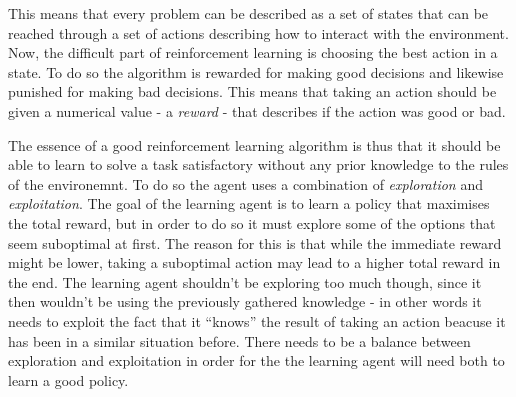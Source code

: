 \documentclass[11pt]{article}
\begin{document}
This means that every problem can be described as a set of states that can be reached
through a set of actions describing how to interact with the environment.
Now, the difficult part of reinforcement learning is choosing the best action in a
state.
To do so the algorithm is rewarded for making good decisions and likewise punished for making
bad decisions.
This means that taking an action should be given a numerical value
- a \textit{reward} - that describes if the action was good or bad.

The essence of a good reinforcement learning algorithm is thus that it should be able to learn
to solve a task satisfactory without any prior knowledge to the rules of the environemnt.
To do so the agent uses a combination of \textit{exploration} and \textit{exploitation}.
The goal of the learning agent is to learn a policy that maximises the total reward, but in order to do
so it must explore some of the options that seem suboptimal at first.
The reason for this is that while the immediate reward might be lower, taking a
suboptimal action may lead to a higher total reward in the end.
The learning agent shouldn't be exploring too much though, since it then wouldn't
be using the previously gathered knowledge - in other words it needs to
exploit the fact that it “knows” the result of taking an action beacuse it has been in
a similar situation before.
There needs to be a balance between exploration and exploitation in order for the the
learning agent will need both to learn a good policy.
\end{document}
